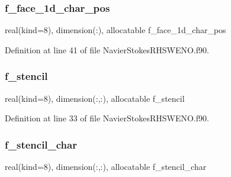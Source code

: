 \hypertarget{structnavierstokesrhsweno_1_1dissipation__local_a38306f909951083c4a6101ce905644e8}{}\label{structnavierstokesrhsweno_1_1dissipation__local_a38306f909951083c4a6101ce905644e8} 
\subsubsection{\texorpdfstring{f\+\_\+face\+\_\+1d\+\_\+char\+\_\+pos}{f\_face\_1d\_char\_pos}}
{\footnotesize\ttfamily real(kind=8), dimension(\+:), allocatable f\+\_\+face\+\_\+1d\+\_\+char\+\_\+pos}



Definition at line 41 of file Navier\+Stokes\+R\+H\+S\+W\+E\+N\+O.\+f90.

\hypertarget{structnavierstokesrhsweno_1_1dissipation__local_acaf3c6c9cfc777c8c75fcf89ad523c6a}{}\label{structnavierstokesrhsweno_1_1dissipation__local_acaf3c6c9cfc777c8c75fcf89ad523c6a} 
\subsubsection{\texorpdfstring{f\+\_\+stencil}{f\_stencil}}
{\footnotesize\ttfamily real(kind=8), dimension(\+:,\+:), allocatable f\+\_\+stencil}



Definition at line 33 of file Navier\+Stokes\+R\+H\+S\+W\+E\+N\+O.\+f90.

\hypertarget{structnavierstokesrhsweno_1_1dissipation__local_ae8ab145750afee96ec10369c19e7e70d}{}\label{structnavierstokesrhsweno_1_1dissipation__local_ae8ab145750afee96ec10369c19e7e70d} 
\subsubsection{\texorpdfstring{f\+\_\+stencil\+\_\+char}{f\_stencil\_char}}
{\footnotesize\ttfamily real(kind=8), dimension(\+:,\+:), allocatable f\+\_\+stencil\+\_\+char}



